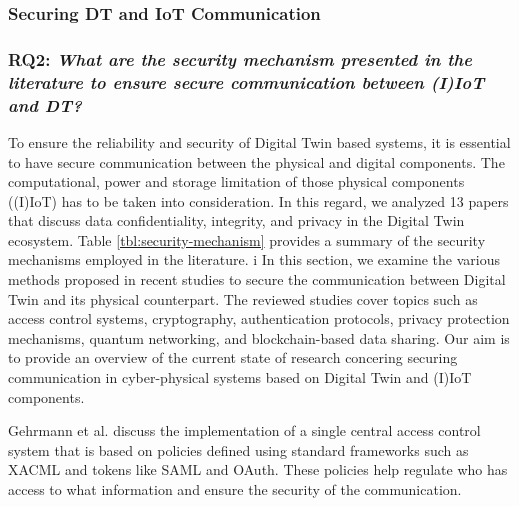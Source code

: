 %
%
\subsubsection{Securing DT and IoT Communication}
\subsubsection*{RQ2: \textit{What are the security mechanism presented in the literature to ensure secure communication between (I)IoT and DT?}}

To ensure the reliability and security of Digital Twin based systems, it is essential to have secure communication between the physical and digital components. The computational, power and storage limitation of those physical components ((I)IoT) has to be taken into consideration. In this regard, we analyzed 13 papers that discuss data confidentiality, integrity, and privacy in the Digital Twin ecosystem. Table \ref{tbl:security-mechanism} provides a summary of  the security mechanisms employed in the literature. 
i
In this section, we examine the various methods proposed in recent studies to secure the communication between Digital Twin and its physical counterpart. The reviewed studies cover topics such as access control systems, cryptography, authentication protocols, privacy protection mechanisms, quantum networking, and blockchain-based data sharing. Our aim is to provide an overview of the current state of research concering securing communication in cyber-physical systems based on Digital Twin and (I)IoT components.

Gehrmann et al.\cite{gehrmannDigitalTwinBased2020} discuss the implementation of a single central access control system that is based on policies defined using standard frameworks such as XACML and tokens like SAML and OAuth. These policies help regulate who has access to what information and ensure the security of the communication.  


